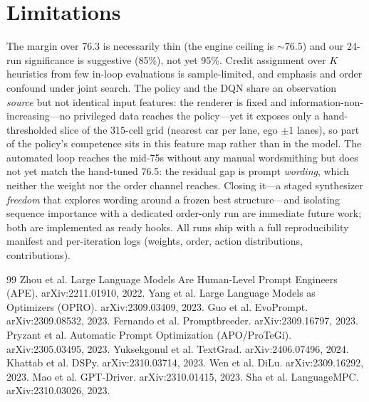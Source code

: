 \documentclass[10pt]{article}
\begin{document}
\section{Limitations}
The margin over 76.3 is necessarily thin (the engine ceiling is ${\sim}76.5$) and
our 24-run significance is suggestive (85\%), not yet 95\%. Credit assignment over
$K$ heuristics from few in-loop evaluations is sample-limited, and emphasis and
order confound under joint search. The policy and the DQN share an observation
\emph{source} but not identical input features: the renderer is fixed and
information-non-increasing---no privileged data reaches the policy---yet it
exposes only a hand-thresholded slice of the 315-cell grid (nearest car per lane,
ego $\pm 1$ lanes), so part of the policy's competence sits in this feature map
rather than in the model. The automated loop reaches the mid-75s without
any manual wordsmithing but does not yet match the hand-tuned 76.5: the residual
gap is prompt \emph{wording}, which neither the weight nor the order channel
reaches. Closing it---a staged synthesizer \emph{freedom} that explores wording
around a frozen best structure---and isolating sequence importance with a
dedicated order-only run are immediate future work; both are implemented as ready
hooks. All runs ship with a full reproducibility manifest and per-iteration logs
(weights, order, action distributions, contributions).

{\small
\begin{thebibliography}{99}
\setlength{\itemsep}{0pt}\setlength{\parskip}{0pt}
 Zhou et al. Large Language Models Are Human-Level Prompt Engineers (APE). arXiv:2211.01910, 2022.
 Yang et al. Large Language Models as Optimizers (OPRO). arXiv:2309.03409, 2023.
 Guo et al. EvoPrompt. arXiv:2309.08532, 2023.
 Fernando et al. Promptbreeder. arXiv:2309.16797, 2023.
 Pryzant et al. Automatic Prompt Optimization (APO/ProTeGi). arXiv:2305.03495, 2023.
 Yuksekgonul et al. TextGrad. arXiv:2406.07496, 2024.
 Khattab et al. DSPy. arXiv:2310.03714, 2023.
 Wen et al. DiLu. arXiv:2309.16292, 2023.
 Mao et al. GPT-Driver. arXiv:2310.01415, 2023.
 Sha et al. LanguageMPC. arXiv:2310.03026, 2023.
\end{thebibliography}
}
\end{document}

